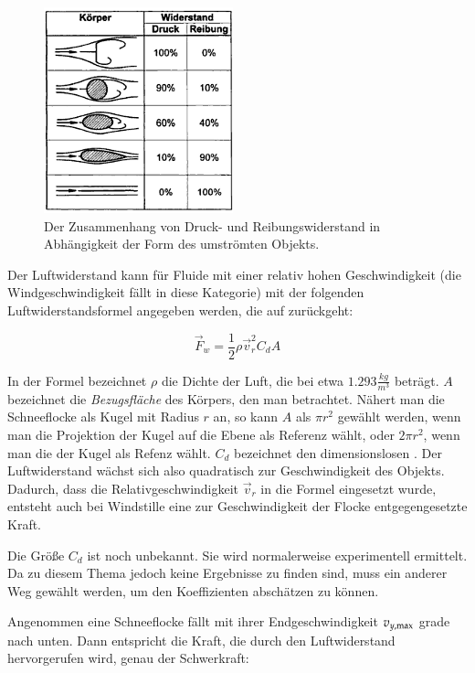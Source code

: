 \begin{figure}[ht]
    \centering
    \includegraphics{images/drag_forces}
    \caption{Der Zusammenhang von Druck- und Reibungswiderstand in Abhängigkeit der Form des umströmten Objekts.}
    \label{fig:implementation_snowflake_drag_forces}
\end{figure}

Der Luftwiderstand kann für Fluide mit einer relativ hohen
Geschwindigkeit (die Windgeschwindigkeit fällt in diese Kategorie) mit
der folgenden Luftwiderstandsformel angegeben werden, die auf 
zurückgeht:

\begin{equation}
\label{eq:implementation_snowflake_drag_equation}
\vec{F}_w = \frac{1}{2} \rho \vec{v}_r^2 C_d A
\end{equation}

In der Formel bezeichnet $\rho$ die Dichte der Luft, die bei
 etwa $1.293\frac{kg}{m^3}$ beträgt. $A$ bezeichnet
die \emph{Bezugsfläche} des Körpers, den man betrachtet. Nähert man
die Schneeflocke als Kugel mit Radius $r$ an, so kann $A$ als $\pi
r^2$ gewählt werden, wenn man die Projektion der Kugel auf die Ebene
als Referenz wählt, oder $2\pi r^2$, wenn man die
 der Kugel als Refenz wählt. $C_d$
bezeichnet den dimensionslosen
. Der Luftwiderstand
wächst sich also quadratisch zur Geschwindigkeit des Objekts. Dadurch,
dass die Relativgeschwindigkeit $\vec{v}_r$ in die Formel eingesetzt
wurde, entsteht auch bei Windstille eine zur Geschwindigkeit der
Flocke entgegengesetzte Kraft.

Die Größe $C_d$ ist noch unbekannt. Sie wird normalerweise
experimentell ermittelt. Da zu diesem Thema jedoch keine Ergebnisse zu
finden sind, muss ein anderer Weg gewählt werden, um den Koeffizienten
abschätzen zu können.

Angenommen eine Schneeflocke fällt mit ihrer Endgeschwindigkeit
$v_{y,\textnormal{max}}$ grade nach unten. Dann
entspricht die Kraft, die durch den Luftwiderstand hervorgerufen wird,
genau der Schwerkraft:

